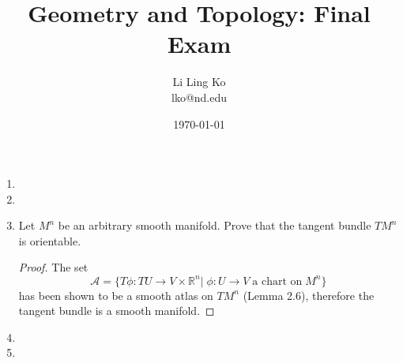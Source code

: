 \documentclass{article}
\begin{document}
\title{Geometry and Topology: Final Exam}
\author{Li Ling Ko\\ lko@nd.edu}
\date{\today}
\maketitle

\begin{enumerate}[label={\bf Q\arabic*:}]
  \item

  \item

  \item Let $M^n$ be an arbitrary smooth manifold. Prove that the tangent
    bundle $TM^n$ is orientable.

    \begin{proof}
      The set 
      \[\mathcal{A} = \{T\phi:TU\rightarrow V\times\mathbb{R}^n|\;
        \phi:U\rightarrow V\; \text{a chart on}\; M^n\}\]
      has been shown to be a smooth atlas on $TM^n$ (Lemma 2.6), therefore
      the tangent bundle is a smooth manifold.
    \end{proof}

  \item

  \item
\end{enumerate}
\end{document}
